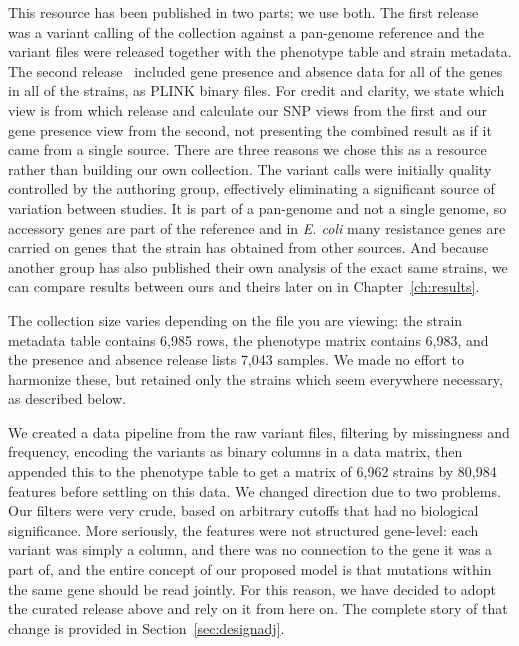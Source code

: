 \vspace{1em}

This resource has been published in two parts; we use both. The first
release~\cite{morin2024ecoli} was a variant calling of the collection against a pan-genome
reference and the variant files were released together with the phenotype table and strain
metadata. The second release~\cite{york2025amr} included gene presence and absence data for
all of the genes in all of the strains, as PLINK binary files. For credit and clarity, we state which view is from which release and calculate our SNP views
from the first and our gene presence view from the second, not presenting the combined result
as if it came from a single source. There are three reasons we chose this
as a resource rather than building our own collection. The variant calls were initially
quality controlled by the authoring group, effectively eliminating a significant source of
variation between studies. It is part of a pan-genome and not a single genome, so accessory
genes are part of the reference and in \textit{E. coli} many resistance genes are carried on
genes that the strain has obtained from other sources. And because another group has also
published their own analysis of the exact same strains, we can compare results between ours
and theirs later on in Chapter~\ref{ch:results}.

\vspace{1em}

The collection size varies depending on the file you are viewing: the strain metadata table
contains 6,985 rows, the phenotype matrix contains 6,983, and the presence and absence release
lists 7,043 samples. We made no effort to harmonize these, but retained only the strains which
seem everywhere necessary, as described below.

\vspace{1em}

We created a data pipeline from the raw variant files, filtering by missingness and frequency,
encoding the variants as binary columns in a data matrix, then appended this to the phenotype
table to get a matrix of 6,962 strains by 80,984 features before settling on this data. We
changed direction due to two problems. Our filters were very crude, based on arbitrary cutoffs
that had no biological significance. More seriously, the features were not structured
gene-level: each variant was simply a column, and there was no connection to the gene it was a
part of, and the entire concept of our proposed model is that mutations within the same gene
should be read jointly. For this reason, we have decided to adopt the curated release above
and rely on it from here on. The complete story of that change is provided in
Section~\ref{sec:designadj}.


